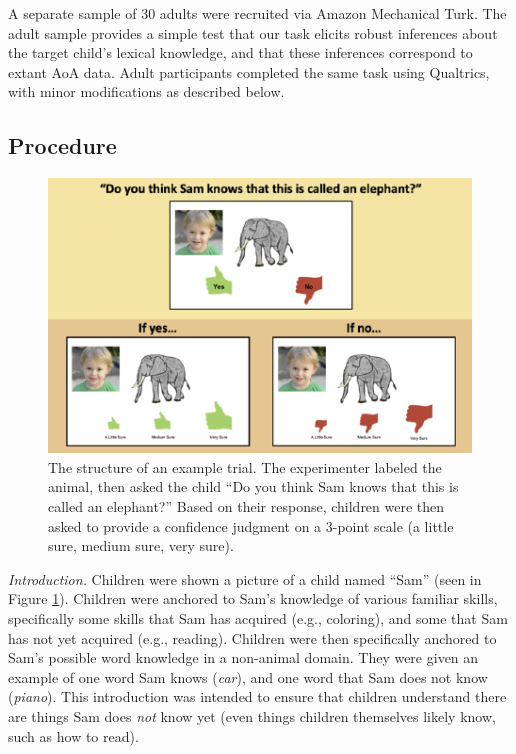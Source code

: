 \documentclass[10pt, letterpaper]{article}
\newenvironment{CodeChunk}{}{}
\begin{document}
A separate sample of 30 adults were recruited via Amazon Mechanical
Turk. The adult sample provides a simple test that our task elicits
robust inferences about the target child's lexical knowledge, and that
these inferences correspond to extant AoA data. Adult participants
completed the same task using Qualtrics, with minor modifications as
described below.

\hypertarget{procedure}{%
\subsection{Procedure}\label{procedure}}

\begin{CodeChunk}
\begin{figure}[tb]

{\centering \includegraphics{figs/task-method-1}

}

\caption[The structure of an example trial]{The structure of an example trial. The experimenter labeled the animal, then asked the child “Do you think Sam knows that this is called an elephant?” Based on their response, children were then asked to provide a confidence judgment on a 3-point scale (a little sure, medium sure, very sure).}\label{fig:task-method}
\end{figure}
\end{CodeChunk}

\emph{Introduction.} Children were shown a picture of a child named
``Sam'' (seen in Figure \ref{fig:task-method}). Children were anchored
to Sam's knowledge of various familiar skills, specifically some skills
that Sam has acquired (e.g., coloring), and some that Sam has not yet
acquired (e.g., reading). Children were then specifically anchored to
Sam's possible word knowledge in a non-animal domain. They were given an
example of one word Sam knows (\emph{car}), and one word that Sam does
not know (\emph{piano}). This introduction was intended to ensure that
children understand there are things Sam does \emph{not} know yet (even
things children themselves likely know, such as how to read).
\end{document}
